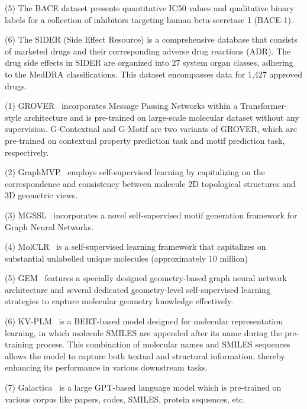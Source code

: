 \documentclass[11pt]{article}
\begin{document}
\noindent(5) The BACE dataset presents quantitative IC50 values and qualitative binary labels for a collection of inhibitors targeting human beta-secretase 1 (BACE-1).

\noindent(6) The SIDER (Side Effect Resource) is a comprehensive database that consists of marketed drugs and their corresponding adverse drug reactions (ADR). The drug side effects in SIDER are organized into 27 system organ classes, adhering to the MedDRA classifications. This dataset encompasses data for 1,427 approved drugs.


\noindent(1) GROVER~\citep{rong2020self} incorporates Message Passing Networks within a Transformer-style architecture and is pre-trained on large-scale molecular dataset without any supervision. G-Contextual and G-Motif are two variants of GROVER, which are pre-trained on contextual property prediction task and motif prediction task, respectively.

\noindent(2) GraphMVP~\citep{DBLP:conf/iclr/LiuWLLGT22} employs self-supervised learning by capitalizing on the correspondence and consistency between molecule 2D topological structures and 3D geometric views. 

\noindent(3) MGSSL~\citep{zhang2021motif} incorporates a novel self-supervised motif generation framework for Graph Neural Networks.

\noindent(4) MolCLR~\citep{wang2022molecular} is a self-supervised learning framework that capitalizes on substantial unlabelled unique molecules (approximately 10 million)

\noindent(5) GEM~\citep{fang2022geometry} features a specially designed geometry-based graph neural network architecture and several dedicated geometry-level self-supervised learning strategies to capture molecular geometry knowledge effectively.

\noindent(6) KV-PLM~\citep{zeng2022deep} is a BERT-based model designed for molecular representation learning, in which molecule SMILES are appended after its name during the pre-training process. This combination of molecular names and SMILES sequences allows the model to capture both textual and structural information, thereby enhancing its performance in various downstream tasks.

\noindent(7) Galactica~\citep{taylor2022galactica} is a large GPT-based language model which is pre-trained on various corpus like papers, codes, SMILES, protein sequences, etc.
\end{document}
